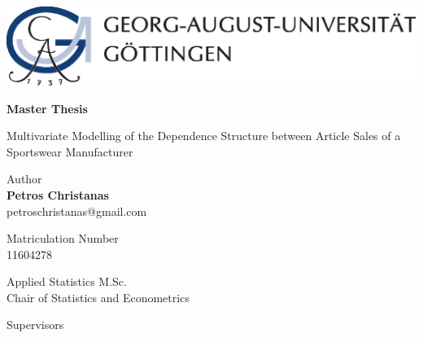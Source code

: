 
\thispagestyle{empty}
\begin{center}


\begin{minipage}{0.75\linewidth}
    \centering
    \includegraphics[scale = 0.7]{figures/uni_goettingen_logo.eps}\\
    
    \vspace{1cm}
    
{{\Huge \textbf{Master Thesis} \par}}
    
\vspace{0.5cm}
    
    {{\LARGE Multivariate Modelling of the Dependence Structure between Article Sales of a Sportswear Manufacturer\par}}
    \vspace{1cm}
    
    
\begin{center}
Author\\
{\LARGE \textbf{Petros Christanas}} \\
{\large petroschristanas@gmail.com}


\vspace{0.5cm}

Matriculation Number \\
{\large 11604278}

\vspace{1cm}

{\Large Applied Statistics M.Sc.}\\
{\large Chair of Statistics and Econometrics}

\end{center}
    
    \end{minipage}
\end{center}


\vspace{1.5cm}

\noindent Supervisors\\
 \\
 \\

\vspace{0.5cm}
    
\begin{flushleft}
 \\
\end{flushleft}

    
    

\clearpage